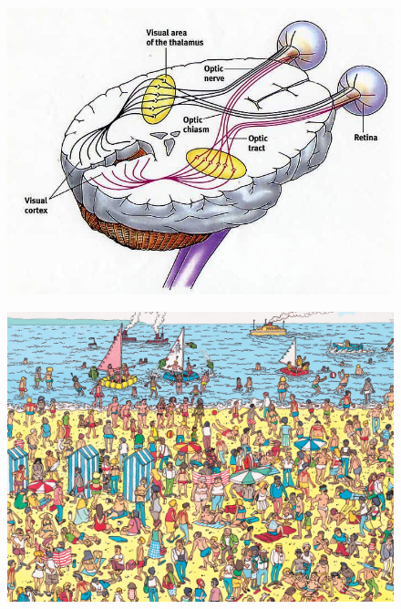 \documentclass[10pt]{beamer}
\begin{document}
\begin{frame}{}
    \begin{figure}
        \centering
        \includegraphics[width=0.9\linewidth]{./img/visual_system_brain.jpg}
    \end{figure}
\end{frame}

\begin{frame}{}
    \begin{figure}
        \centering
        \includegraphics[width=0.9\linewidth]{./img/wheres_wally.jpg}
    \end{figure}
\end{frame}
\end{document}

